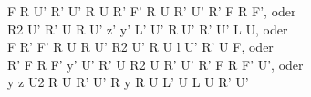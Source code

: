 F R U' R' U' R U R' F' R U R' U' R' F R F', oder\\
R2 U' R' U R U' z' y' L' U' R U' R' U' L U, oder\\
F R' F' R U R U' R2 U' R U l U' R' U F, oder\\
R' F R F' y' U' R' U R2 U R' U' R' F R F' U', oder\\
y z U2 R U R' U' R y R U L' U L U R' U'\\
